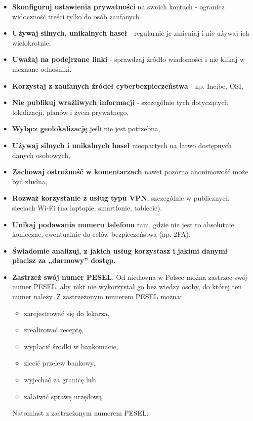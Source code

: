 \begin{itemize}
  \item \textbf{Skonfiguruj ustawienia prywatności} na swoich kontach - ogranicz widoczność treści tylko do osób zaufanych.
  \item \textbf{Używaj silnych, unikalnych haseł} - regularnie je zmieniaj i nie używaj ich wielokrotnie.
  \item \textbf{Uważaj na podejrzane linki} - sprawdzaj źródło wiadomości i nie klikaj w nieznane odnośniki.
  \item \textbf{Korzystaj z zaufanych źródeł cyberbezpieczeństwa} - np. Incibe, OSI,
  \item \textbf{Nie publikuj wrażliwych informacji} - szczególnie tych dotyczących lokalizacji, planów i życia prywatnego,
  \item \textbf{Wyłącz geolokalizację} jeśli nie jest potrzebna,
  \item \textbf{Używaj silnych i unikalnych haseł} nieopartych na łatwo dostępnych danych osobowych,
  \item \textbf{Zachowaj ostrożność w komentarzach} nawet pozorna anonimowość może być złudna,
  \item \textbf{Rozważ korzystanie z usług typu VPN}, szczególnie w publicznych sieciach Wi-Fi (na laptopie, smartfonie, tablecie).
  \item \textbf{Unikaj podawania numeru telefonu} tam, gdzie nie jest to absolutnie konieczne, ewentualnie do celów bezpieczeństwa (np. 2FA).
  \item \textbf{Świadomie analizuj, z jakich usług korzystasz i jakimi danymi płacisz za „darmowy” dostęp.}
  \item \textbf{Zastrzeż swój numer PESEL}. Od niedawna w Polsce można zastrzec swój numer PESEL, aby nikt nie wykorzystał go bez wiedzy osoby, do której ten numer należy. Z zastrzeżonym numerem PESEL można:
  \begin{itemize}
    \item zarejestrować się do lekarza,
    \item zrealizować receptę,
    \item wypłacić środki w bankomacie,
    \item zlecić przelew bankowy,
    \item wyjechać za granicę lub
    \item załatwić sprawę urzędową.
  \end{itemize}
  Natomiast z zastrzeżonym numerem PESEL:
  \begin{itemize}

\end{itemize}
\end{itemize}
